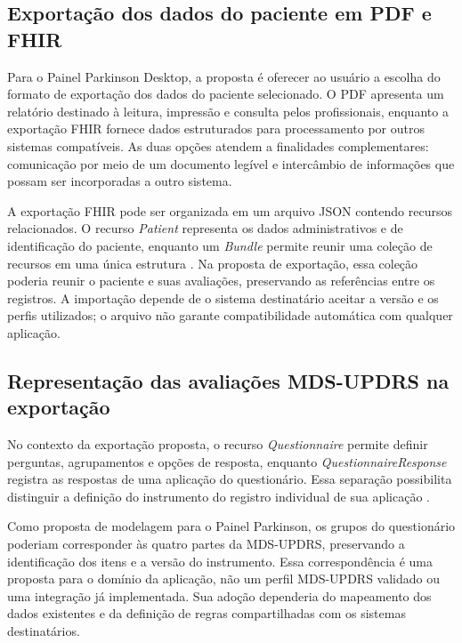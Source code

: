 \subsection{Exportação dos dados do paciente em PDF e FHIR}

Para o Painel Parkinson Desktop, a proposta é oferecer ao usuário a escolha do formato de exportação dos dados do paciente selecionado. O PDF apresenta um relatório destinado à leitura, impressão e consulta pelos profissionais, enquanto a exportação FHIR fornece dados estruturados para processamento por outros sistemas compatíveis. As duas opções atendem a finalidades complementares: comunicação por meio de um documento legível e intercâmbio de informações que possam ser incorporadas a outro sistema.

A exportação FHIR pode ser organizada em um arquivo JSON contendo recursos relacionados. O recurso \textit{Patient} representa os dados administrativos e de identificação do paciente, enquanto um \textit{Bundle} permite reunir uma coleção de recursos em uma única estrutura \cite{hl7FHIRpatient2023,hl7FHIRbundle2023}. Na proposta de exportação, essa coleção poderia reunir o paciente e suas avaliações, preservando as referências entre os registros. A importação depende de o sistema destinatário aceitar a versão e os perfis utilizados; o arquivo não garante compatibilidade automática com qualquer aplicação.

\subsection{Representação das avaliações MDS-UPDRS na exportação}

No contexto da exportação proposta, o recurso \textit{Questionnaire} permite definir perguntas, agrupamentos e opções de resposta, enquanto \textit{QuestionnaireResponse} registra as respostas de uma aplicação do questionário. Essa separação possibilita distinguir a definição do instrumento do registro individual de sua aplicação \cite{hl7FHIRquestionnaire2023}.

Como proposta de modelagem para o Painel Parkinson, os grupos do questionário poderiam corresponder às quatro partes da MDS-UPDRS, preservando a identificação dos itens e a versão do instrumento. Essa correspondência é uma proposta para o domínio da aplicação, não um perfil MDS-UPDRS validado ou uma integração já implementada. Sua adoção dependeria do mapeamento dos dados existentes e da definição de regras compartilhadas com os sistemas destinatários.

